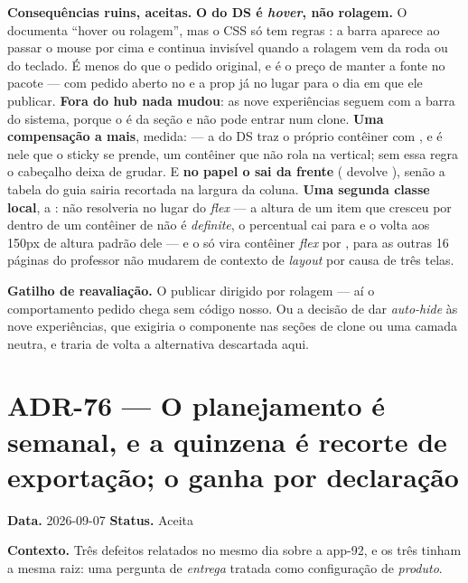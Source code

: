 \textbf{Consequências ruins, aceitas.} \textbf{O  do DS é
\emph{hover}, não rolagem.} O  documenta \enquote{hover
ou rolagem}, mas o CSS só tem regras : a barra aparece ao passar o
mouse por cima e continua invisível quando a rolagem vem da roda ou do teclado.
É menos do que o pedido original, e é o preço de manter a fonte no pacote ---
com pedido aberto no  e a prop já no lugar para o dia em
que ele publicar. \textbf{Fora do hub nada mudou}: as nove experiências seguem
com a barra do sistema, porque o  é da seção  e não
pode entrar num clone. \textbf{Uma compensação a mais}, medida:
 --- a
 do DS traz o próprio contêiner com , e é nele
que o  sticky se prende, um contêiner que não rola na vertical; sem
essa regra o cabeçalho deixa de grudar. E \textbf{no papel o  sai
da frente} ( devolve ), senão a tabela do
guia sairia recortada na largura da coluna. \textbf{Uma segunda classe local}, a
:  não resolveria no lugar do \emph{flex} ---
a altura de um item que cresceu por  dentro de um contêiner de
 não é \emph{definite}, o percentual cai para  e o
 volta aos 150px de altura padrão dele --- e o  só vira
contêiner \emph{flex} por , para as outras 16 páginas do
professor não mudarem de contexto de \emph{layout} por causa de três telas.

\textbf{Gatilho de reavaliação.} O  publicar
 dirigido por rolagem --- aí o comportamento pedido chega sem
código nosso. Ou a decisão de dar \emph{auto-hide} às nove experiências, que
exigiria o componente nas seções de clone ou uma camada neutra, e traria de
volta a alternativa descartada aqui.

\section{ADR-76 --- O planejamento é semanal, e a quinzena é recorte de
exportação; o  ganha  por declaração}
\label{adr:76}

\textbf{Data.} 2026-09-07 \quad \textbf{Status.} Aceita

\textbf{Contexto.} Três defeitos relatados no mesmo dia sobre a app-92, e os
três tinham a mesma raiz: uma pergunta de \emph{entrega} tratada como
configuração de \emph{produto}.

